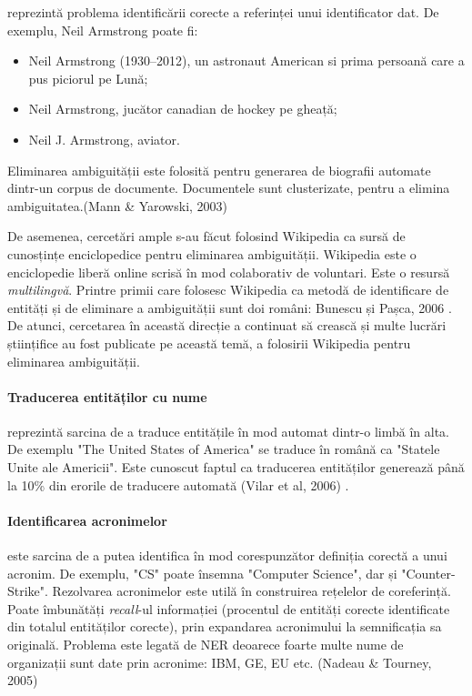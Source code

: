reprezintă problema identificării corecte a referinței unui identificator dat. De exemplu, Neil Armstrong poate fi:

\begin{itemize}
\item Neil Armstrong (1930–2012), un astronaut American si prima persoană care a pus piciorul pe Lună;
\item Neil Armstrong, jucător canadian de hockey pe gheață;
\item Neil J. Armstrong, aviator.
\end{itemize}

Eliminarea ambiguității este folosită pentru generarea de biografii automate dintr-un corpus de documente. Documentele sunt clusterizate, pentru a elimina ambiguitatea.(Mann \& Yarowski, 2003)\cite{Mann03unsupervisedpersonal}

De asemenea, cercetări ample s-au făcut folosind Wikipedia ca sursă de cunosțințe enciclopedice pentru eliminarea ambiguității. Wikipedia este o enciclopedie liberă online scrisă în mod colaborativ de voluntari. Este o resursă \textit{multilingvă}. Printre primii care folosesc Wikipedia ca metodă de identificare de entități și de eliminare a ambiguității sunt doi români: Bunescu și Pașca, 2006 \cite{Bunescu06usingencyclopedic}. De atunci, cercetarea în această direcție a continuat să crească și multe lucrări științifice au fost publicate pe această temă, a folosirii Wikipedia pentru eliminarea ambiguității.

\paragraph{Traducerea entităților cu nume}

reprezintă sarcina de a traduce entitățile în mod automat dintr-o limbă în alta. De exemplu "The United States of America" se traduce în română ca "Statele Unite ale Americii". Este cunoscut faptul ca traducerea entităților generează până la 10\% din erorile de traducere automată (Vilar et al, 2006) \cite{vilar2006}.

\paragraph{Identificarea acronimelor}

este sarcina de a putea identifica în mod corespunzător definiția corectă a unui acronim. De exemplu, "CS" poate însemna "Computer Science", dar și "Counter-Strike". Rezolvarea  acronimelor este utilă în construirea rețelelor de coreferință. Poate îmbunătăți \textit{recall}-ul informației (procentul de entități corecte identificate din totalul entităților corecte), prin expandarea acronimului la semnificația sa originală. Problema este legată de NER deoarece foarte multe nume de organizații sunt date prin acronime: IBM, GE, EU etc. (Nadeau \& Tourney, 2005)\cite{Nadeau05asupervised}

